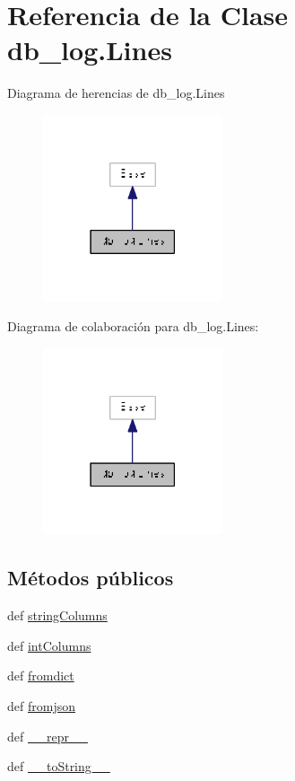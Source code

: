\hypertarget{classdb__log_1_1_lines}{\section{Referencia de la Clase db\-\_\-log.\-Lines}
\label{classdb__log_1_1_lines}
}


Diagrama de herencias de db\-\_\-log.\-Lines\nopagebreak
\begin{figure}[H]
\begin{center}
\leavevmode
\includegraphics[width=150pt]{classdb__log_1_1_lines__inherit__graph}
\end{center}
\end{figure}


Diagrama de colaboración para db\-\_\-log.\-Lines\-:\nopagebreak
\begin{figure}[H]
\begin{center}
\leavevmode
\includegraphics[width=150pt]{classdb__log_1_1_lines__coll__graph}
\end{center}
\end{figure}
\subsection*{Métodos públicos}
\begin{DoxyCompactItemize}
\item 
def \hyperlink{classdb__log_1_1_lines_a7ed83f9b62253730ba834116b3a9dacb}{string\-Columns}
\item 
def \hyperlink{classdb__log_1_1_lines_af5b1c788ddcbd885dfd504a582bfb2cc}{int\-Columns}
\item 
def \hyperlink{classdb__log_1_1_lines_a52ae33670fb93711d6016d66c78a5619}{fromdict}
\item 
def \hyperlink{classdb__log_1_1_lines_a914fd0c463878da41107306755afeb4b}{fromjson}
\item 
def \hyperlink{classdb__log_1_1_lines_aa548522f88fa1ea01ffe26cdbdb26054}{\-\_\-\-\_\-repr\-\_\-\-\_\-}
\item 
def \hyperlink{classdb__log_1_1_lines_aff5943fbeba30789d71e44a6a5fd61f1}{\-\_\-\-\_\-to\-String\-\_\-\-\_\-}
\end{DoxyCompactItemize}
